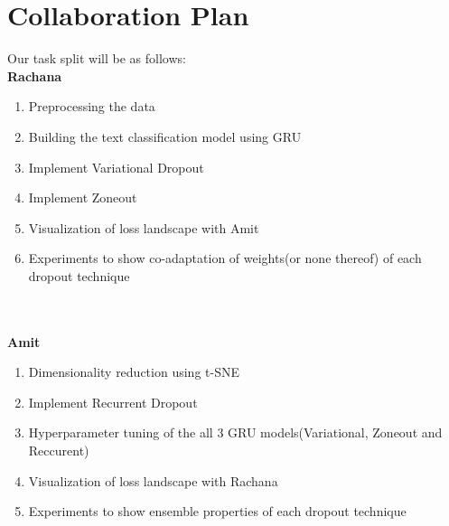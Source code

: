 \documentclass[11pt,a4paper]{article}
\begin{document}
\section{Collaboration Plan}
Our task split will be as follows: 
\\\textbf{Rachana}
\begin{enumerate}
    \item Preprocessing the data
    \item Building the text classification model using GRU
    \item Implement Variational Dropout
    \item Implement Zoneout
    \item Visualization of loss landscape with Amit
    \item Experiments to show co-adaptation of weights(or none thereof) of each dropout technique
    
\end{enumerate}
\\\\\textbf{Amit}
\begin{enumerate}
    \item Dimensionality reduction using t-SNE
    \item Implement Recurrent Dropout
    \item Hyperparameter tuning of the all 3 GRU models(Variational, Zoneout and Reccurent)
    \item Visualization of loss landscape with Rachana
    \item Experiments to show ensemble properties of each dropout technique
\end{enumerate}


\footnotesize

\end{document}
